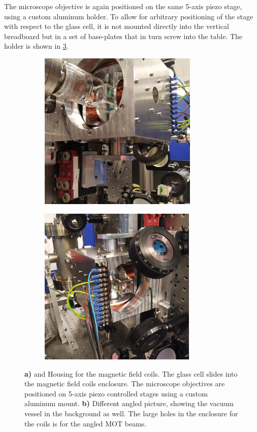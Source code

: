 The microscope objective is again positioned on the same 5-axis piezo stage, using a custom aluminum holder.
To allow for arbitrary positioning of the stage with respect to the glass cell, it is not mounted directly into the vertical breadboard but in a set of base-plates that in turn screw into the table.
The holder is shown in \cref{fig:Coils}.

\begin{figure}
	\begin{subfigure}{.49\linewidth}
		\flushleft
		\includegraphics[height=7.6cm]{figures/CoilsCropped.jpg}
		\caption{}
		\label{fig:Coils1}
	\end{subfigure}
	\hfill
	\begin{subfigure}{.49\linewidth}
		\flushright
		\includegraphics[height=7.6cm]{figures/CoilsCropped2.jpg}
		\caption{}
		\label{fig:Coils2}
	\end{subfigure}
	\caption{
	\textsf{\textbf{a)}} and  Housing for the magnetic field coils. 
	The glass cell slides into the magnetic field coils enclosure.
    The microscope objectives are positioned on 5-axis piezo controlled stages using a custom aluminum mount. 
    \textsf{\textbf{b)}} Different angled picture, showing the vacuum vessel in the background as well. 
    The large holes in the enclosure for the coils is for the angled MOT beams.
    }
    \label{fig:Coils}
\end{figure}


